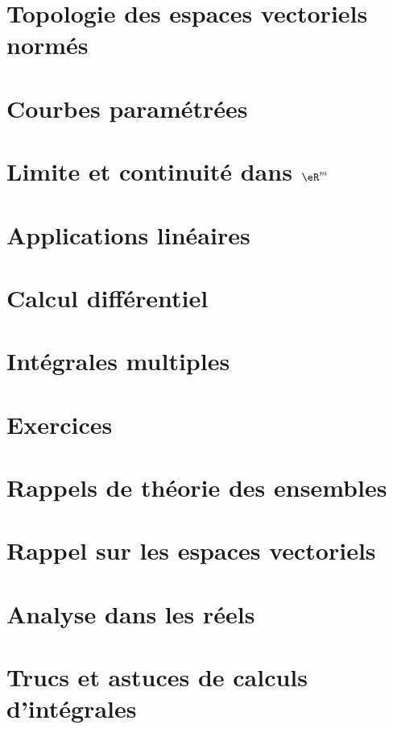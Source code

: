 
\chapter{Topologie des espaces vectoriels normés}      \label{ChapEspVectNorm}


\chapter{Courbes paramétrées}           \label{Chap_courbes}


\chapter{Limite et continuité dans $\eR^m$} \label{ChapLimContinuite}


\chapter{Applications linéaires}        \label{Chap_appl_lin}


\chapter{Calcul différentiel}           \label{ChapCalculDiff}


\chapter{Intégrales multiples}          \label{ChapMultiples}



\chapter{Exercices}             \label{Chap_exercices}


\chapter{Rappels de théorie des ensembles}


\chapter{Rappel sur les espaces vectoriels}    \label{AppendiceEspVectoriels}


\chapter{Analyse dans les réels}        \label{AppendiceAnalyseR}


\chapter{Trucs et astuces de calculs d'intégrales}

